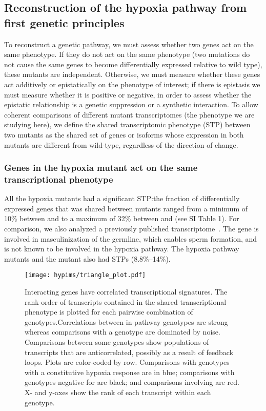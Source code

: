\subsection*{Reconstruction of the hypoxia pathway from first genetic principles}
\label{sec:reconstruct}
To reconstruct a genetic pathway, we must assess whether two genes act on
the same phenotype. If they do not act on the same phenotype (two mutations do
not cause the same genes to become differentially expressed relative to
wild type), these mutants are independent. Otherwise, we must measure whether
these genes act additively or epistatically on the phenotype of interest; if
there is epistasis we must measure whether it is positive or negative, in order
to assess whether the epistatic relationship is a genetic suppression or a
synthetic interaction. To allow coherent comparisons of different mutant
transcriptomes (the phenotype we are studying here), we define the shared
transcriptomic phenotype (STP) between two mutants as the shared set of genes or
isoforms whose expression in both mutants are different from wild-type,
regardless of the direction of change.

\subsubsection*{Genes in the hypoxia mutant act on the same transcriptional
                phenotype}
\label{sec:phenotypes}
All the hypoxia mutants had a significant STP:\@ the fraction of differentially
expressed genes that was shared between mutants ranged from a minimum of 10\%
between \hif{} and \eglvhl{} to a maximum of 32\% between \egl{} and \eglvhl{}
(see SI Table 1).
For comparison, we also analyzed a previously published \fog{}
transcriptome~\citep{Angeles-Albores2017a}. The  gene is involved in
masculinization of the \cel{} germline, which enables sperm formation, and is
not known to be involved in the hypoxia pathway. The hypoxia pathway mutants and
the \fog{} mutant also had STPs (8.8\%--14\%).

\begin{figure}[tbhp]
  \centering
  \texttt{[image: hypims/triangle\_plot.pdf]}
  \caption{
  Interacting genes have correlated transcriptional signatures. The rank order
  of transcripts contained in the shared transcriptional phenotype is plotted
  for each pairwise combination of genotypes.Correlations between in-pathway
  genotypes are strong whereas comparisons with a \fog{} genotype are dominated
  by noise. Comparisons between some genotypes show populations of transcripts
  that are anticorrelated, possibly as a result of feedback loops. Plots are
  color-coded by row. Comparisons with genotypes with a constitutive hypoxia
  response are in blue; comparisons with genotypes negative for \hif{} are
  black; and comparisons involving \fog{} are red. X- and y-axes show the rank
  of each transcript within each genotype.
  }
\label{fig:genetic_interactions}
\end{figure}


